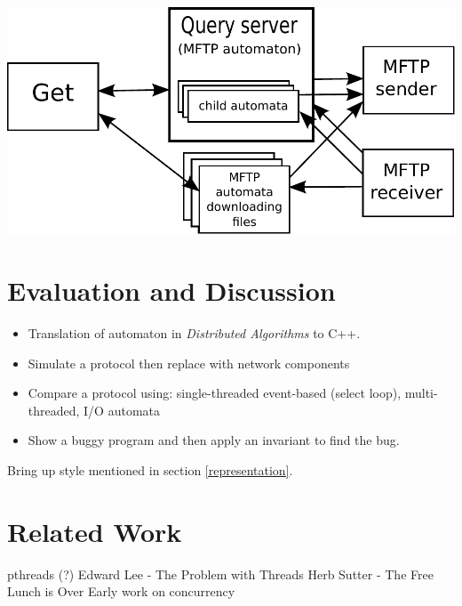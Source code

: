 \documentclass[letterpaper]{article}
\begin{document}
\vspace{2.5 mm}

\includegraphics[scale=0.65]{get_diagram}

\vspace{2 mm}


\section{Evaluation and Discussion\label{evaluation}}

\begin{itemize}
\item Translation of automaton in \emph{Distributed Algorithms} to C++.
\item Simulate a protocol then replace with network components
\item Compare a protocol using: single-threaded event-based (select loop), multi-threaded, I/O automata
\item Show a buggy program and then apply an invariant to find the bug.
\end{itemize}

Bring up style mentioned in section \ref{representation}.

\section{Related Work\label{related_work}}

pthreads (?)
Edward Lee - The Problem with Threads
Herb Sutter - The Free Lunch is Over
Early work on concurrency
\end{document}
